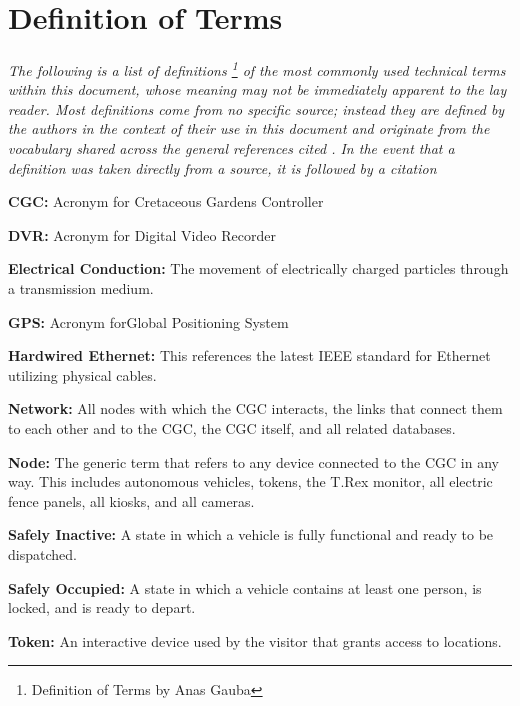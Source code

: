 \documentclass[12pt]{article}
\begin{document}

\section{Definition of Terms} \label{defs} %
	\paragraph{} \textit{The following is a list of definitions \footnote{Definition of Terms by Anas Gauba} of the most commonly 
	used technical terms within this document, whose meaning may not be immediately 
	apparent to the lay reader. Most definitions come from no specific source; instead 
	they are defined by the authors in the context of their use in this document and 
	originate from the vocabulary shared across the general references cited \nocite{*}. In 
	the event that a definition was taken directly from a source, it is followed by a 
	citation}
	
	\begin{list}{}{}
	\item \textbf{CGC:} Acronym for Cretaceous Gardens Controller 
	\item \textbf{DVR:} Acronym for Digital Video Recorder
	\item \textbf{Electrical Conduction:} The movement of electrically charged particles through a transmission medium.
	\item \textbf{GPS:} Acronym forGlobal Positioning System 
	\item \textbf{Hardwired Ethernet:} This references the latest IEEE standard for Ethernet utilizing physical cables.
	\item \textbf{Network:} All nodes with which the CGC interacts, the links that connect them to each other and to the
	CGC, the CGC itself, and all related databases.
	\item \textbf{Node:} The generic term that refers to any device connected to the CGC in any way. This includes 
	autonomous vehicles, tokens, the T.Rex monitor, all electric fence panels, all kiosks, and all cameras.
	\item \textbf{Safely Inactive:} A state in which a vehicle is fully functional and ready to be dispatched.
	\item \textbf{Safely Occupied:} A state in which a vehicle contains at least one person, is locked, and is ready to depart.
	\item \textbf{Token:} An interactive device used by the visitor that grants access to locations.
	\end{list}
	
\pagebreak
\end{document}
